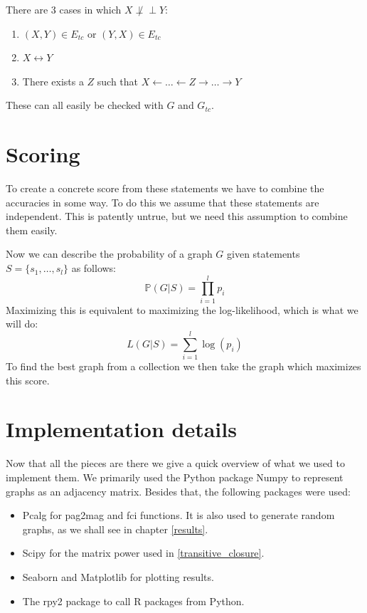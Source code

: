 \documentclass[11pt,a4paper]{report}
\def\ci{\perp\!\!\!\perp}
\begin{document}
There are 3 cases in which $X \not \ci Y$:
\begin{enumerate}
  \item $(X, Y) \in E_{tc}$ or $(Y, X) \in E_{tc}$

  \item $X \leftrightarrow Y$

  \item There exists a $Z$ such that $X \leftarrow \ldots \leftarrow Z
    \rightarrow \ldots \rightarrow Y$
\end{enumerate}
These can all easily be checked with $G$ and $G_{tc}$.

\section{Scoring}
To create a concrete score from these statements we have to combine the
accuracies in some way. To do this we assume that these statements are
independent. This is patently untrue, but we need this assumption to
combine them easily.

Now we can describe the probability of a graph $G$ given statements $S =
\{s_1, \ldots, s_l\}$ as follows:
\begin{equation*}
  \mathbb{P}(G | S) = \prod ^l_{i=1} p_i
\end{equation*}
Maximizing this is equivalent to maximizing the log-likelihood, which is
what we will do:
\begin{equation*}
  L(G|S) = \sum_{i=1}^l \log (p_i)
\end{equation*}
To find the best graph from a collection we then take the graph which
maximizes this score.

\section{Implementation details}
Now that all the pieces are there we give a quick overview of what we used
to implement them. We primarily used the Python package Numpy
\cite{harrisArrayProgrammingNumPy2020} to represent graphs as an adjacency
matrix. Besides that, the following packages were used:
\begin{itemize}
  \item Pcalg\cite{kalischCausalInferenceUsing2012} for pag2mag and fci
    functions. It is also used to generate random graphs, as we shall see
    in chapter \ref{results}.

  \item Scipy\cite{virtanenSciPyFundamentalAlgorithms2020} for the matrix
    power used in \ref{transitive_closure}.

  \item Seaborn\cite{waskomSeabornStatisticalData2021} and
    Matplotlib\cite{hunterMatplotlib2DGraphics2007} for plotting results.

  \item The rpy2 package to call R packages from Python.
\end{itemize}
\end{document}
